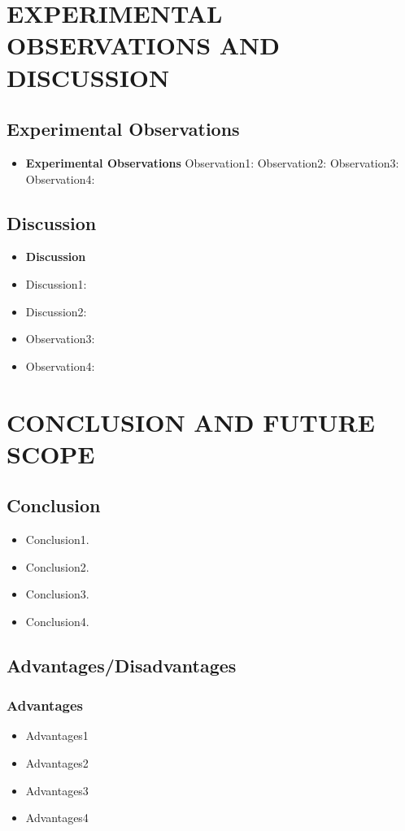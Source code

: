 \documentclass[12pt]{report}	%
\begin{document}
\clearpage


\chapter{EXPERIMENTAL OBSERVATIONS AND DISCUSSION }
\section{Experimental Observations}
\begin{itemize}
\item{\bf Experimental Observations}
Observation1: 
Observation2: 
Observation3: 
Observation4: 
\end{itemize}


\section{Discussion}
\begin{itemize}
    \item{\bf Discussion}
\item Discussion1: 
\item Discussion2: 
\item Observation3: 
\item Observation4: 
\end{itemize}


\newpage
\chapter {CONCLUSION AND FUTURE SCOPE}
\section{Conclusion }
 \begin{itemize}
 \item Conclusion1.
 \item Conclusion2.
 \item Conclusion3.
 \item Conclusion4.
 \end{itemize}
\section{Advantages/Disadvantages}
\subsection{Advantages}
\begin{itemize}
    \item Advantages1
\item Advantages2
\item Advantages3
\item Advantages4
\end{itemize}
\end{document}
